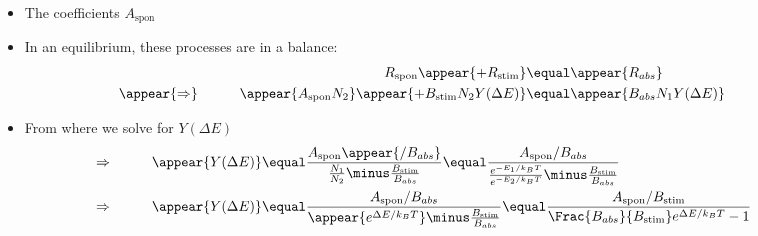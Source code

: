 \begin{frame}
\frametitle{\texorpdfstring{\culine[\sectiontitleulinecolor]{\sectiontitle}}{\sectiontitle} }

\begin{itemize}
	\item The coefficients $A_{\text {spon}}$  
	
	\item In an equilibrium, these processes are in a balance:
\[
\begin{aligned}
& & R_{\text {spon}} \appear{+R_{\text {stim}}}  &\equal \appear{R_{abs}} \\
 &\appear{\Rightarrow}& \qquad \appear{A_{\text {spon}} N_{2}} \appear{+B_{\text {stim}} N_{2} Y(\Delta E)} & \equal \appear{B_{abs} N_{1} Y(\Delta E)} \qquad \quad 
\end{aligned}
\]

\item From where we solve for $Y(\Delta E)$
\[
\begin{aligned}
&\Rightarrow& 
\qquad \appear{Y(\Delta E)} & \equal \frac{A_{\text {spon}} \appear{/ B_{abs}}}{\frac{N_{1}}{N_{2}}  \minus \frac{B_{\text {stim}}}{B_{abs}}}
 \equal 
 \frac{A_{\text {spon}} / B_{abs}}{\frac{e^{-E_{1} / k_{B} T}}{e^{-E_{2} / k_{B} T}}  \minus \frac{B_{\text{stim}}}{B_{abs}}} \\
 \vspace{6mm}
&\Rightarrow&
 \appear{Y(\Delta E)} & \equal \frac{A_{\text {spon}} / B_{abs}}{\appear{e^{\Delta E / k_{B} T}}  \minus \frac{B_{\text {stim}}}{B_{abs}}}
  \equal 
  \frac{A_{\text {spon}} / B_{\text {stim}}}{\Frac{B_{abs}}{B_{\text{stim}}} e^{\Delta E / k_{B} T}-1}  \qquad \quad 
\end{aligned}
\]
\end{itemize}

\endofslide 
\end{frame}

